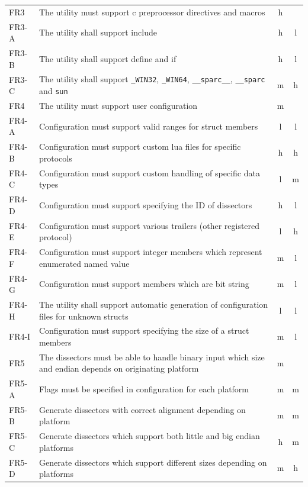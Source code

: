 \begin{table}[htbp]
{\begin{tabularx}{1.2\textwidth}{l X c c}
	\midrule
	FR3 & The \gls{utility} must support \Gls{c} \gls{preprocessor} directives and macros & \Gls{h} & \\
	FR3-A & The \gls{utility} shall support \gls{include} & \Gls{h} & \Gls{l} \\
	FR3-B & The \gls{utility} shall support \gls{define} and \gls{if} & \Gls{h} & \Gls{l} \\
	FR3-C & The \gls{utility} shall support \verb+_WIN32+, \verb+_WIN64+, \verb+__sparc__+, \verb+__sparc+ and \verb+sun+ & \Gls{m} & \Gls{h} \\
	\midrule
	FR4 & The \gls{utility} must support user configuration & \Gls{m} & \\
	FR4-A & Configuration must support valid ranges for \gls{struct} \glspl{member} & \Gls{l} & \Gls{l} \\
	FR4-B & Configuration must support custom \Gls{lua} files for specific \glspl{protocol} & \Gls{h} & \Gls{h} \\
	FR4-C & Configuration must support custom handling of specific data types & \Gls{l} & \Gls{m} \\
	FR4-D & Configuration must support specifying the ID of \glspl{dissector} & \Gls{h} & \Gls{l} \\
	FR4-E & Configuration must support various trailers (other registered \gls{protocol}) & \Gls{l} & \Gls{h} \\
	FR4-F & Configuration must support integer \glspl{member} which represent enumerated named value & \Gls{m} & \Gls{l} \\	
	FR4-G & Configuration must support \glspl{member} which are \gls{bit string} & \Gls{m} & \Gls{l} \\
	FR4-H & The utility shall support automatic generation of configuration files for unknown structs & \Gls{l} & \Gls{l} \\
	FR4-I & Configuration must support specifying the size of a struct members & \Gls{m} & \Gls{l} \\
	\midrule
	FR5 & The \glspl{dissector} must be able to handle \gls{binary} input which size and \gls{endian} depends on originating platform & \Gls{m} & \\
	FR5-A & Flags must be specified in configuration for each platform & \Gls{m} & \Gls{m} \\
	FR5-B & Generate \glspl{dissector} with correct alignment depending on platform & \Gls{m} & \Gls{m} \\
	FR5-C & Generate \glspl{dissector} which support both little and big \gls{endian} platforms & \Gls{h} & \Gls{m} \\
	FR5-D & Generate \glspl{dissector} which support different sizes depending on platforms & \Gls{m} & \Gls{h} \\
	\bottomrule
\end{tabularx}}
\end{table}

